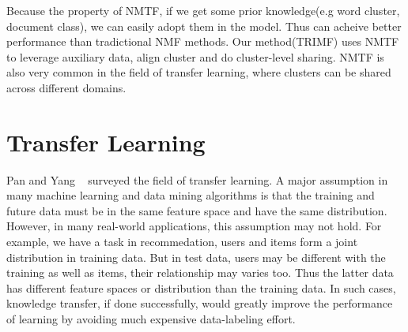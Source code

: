Because the property of NMTF, if we get some prior knowledge(e.g word cluster, document class), we can easily adopt them in the model. Thus can acheive better performance than tradictional NMF methods. Our method(TRIMF) uses NMTF to leverage auxiliary data, align cluster and do cluster-level sharing. NMTF is also very common in the field of transfer learning, where clusters can be shared across different domains.


\hspace{0.1in}
\section{Transfer Learning} Pan and Yang ~\cite{/tkde/sinno09survey} surveyed the field of transfer learning. A major assumption in many machine learning and data mining algorithms is that the training and future data must be in the same feature space and have the same distribution. However, in many real-world applications, this assumption may not hold. For example, we have a task in recommedation, users and items form a joint distribution in training data. But in test data, users may be different with the training as well as items, their relationship may varies too. Thus the latter data has different feature spaces or distribution than the training data. In such cases, knowledge transfer, if done successfully, would greatly improve the performance of learning by avoiding much expensive data-labeling effort.

\hspace{0.05in}
